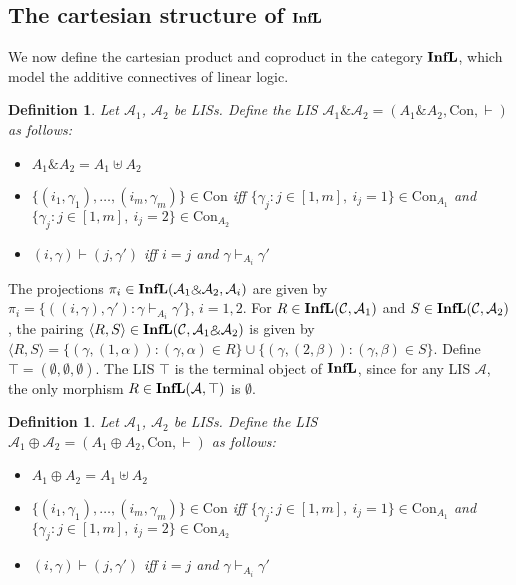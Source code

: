 \documentclass[copyright,creativecommons]{eptcs}
\newtheorem{definition}[theorem]{Definition}
\newcommand{\cA}{\mathcal{A}}
\newcommand{\cC}{\mathcal{C}}
\newcommand{\ga}{\alpha}
\newcommand{\gb}{\beta}
\newcommand{\gc}{\gamma}
\newcommand{\Con}{\mathrm{Con}} \newcommand{\Com}{\mathrm{Com}} \newcommand{\Sup}{\mathrm{Sup}} %
\begin{document}
\subsection{The cartesian structure of $\mathbf{InfL}$}

We now define the cartesian product and coproduct in the category $\mathbf{InfL}$, which model the additive connectives of linear logic.

\medskip

\begin{definition}
Let $\cA_1$, $\cA_2$ be LISs. Define the LIS $\cA_1 \binampersand \cA_2 = (A_1 \binampersand A_2, \Con, \vdash)$ as follows:
\begin{itemize}
\item $A_1 \binampersand A_2 = A_1 \uplus A_2$
\item $\{(i_1,\gc_1), \ldots, (i_m, \gc_m)\} \in \Con$ iff $\{\gc_j : j \in [1,m],\ i_j = 1\} \in \Con_{A_1}$ and $\{\gc_j : j \in [1,m],\ i_j = 2\} \in \Con_{A_2}$
\item $(i, \gc) \vdash (j,\gc')$ iff $i = j$ and $\gc \vdash_{A_i} \gc'$
\end{itemize}
\end{definition}

The projections $\pi_i \in \Infl(\cA_1 \binampersand \cA_2, \cA_i)$ are given by \mbox{$\pi_i = \{((i,\gc), \gc') : \gc \vdash_{A_i} \gc' \}$}, $i = 1,2$. For \mbox{$R \in \Infl(\cC, \cA_1)$} and \mbox{$S \in \Infl(\cC, \cA_2)$}, the pairing \mbox{$\langle R, S \rangle \in \Infl(\cC, \cA_1 \binampersand \cA_2)$} is given by \\ \mbox{$\langle R, S \rangle = \{(\gc, (1,\ga)) : (\gc, \ga) \in R \} \cup \{(\gc, (2,\gb)) : (\gc, \gb) \in S \}$.} Define $\top = (\emptyset, \emptyset, \emptyset)$. The LIS $\top$ is the terminal object of $\mathbf{InfL}$, since for any LIS $\cA$, the only morphism $R \in \Infl(\cA, \top)$ is $\emptyset$.

\medskip

\begin{definition}
Let $\cA_1$, $\cA_2$ be LISs. Define the LIS $\cA_1 \oplus \cA_2 = (A_1 \oplus A_2, \Con, \vdash)$ as follows:
\begin{itemize}
\item $A_1 \oplus A_2 = A_1 \uplus A_2$
\item $\{(i_1,\gc_1), \ldots, (i_m, \gc_m)\} \in \Con$ iff $\{\gc_j : j \in [1,m],\ i_j = 1\} \in \Con_{A_1}$ and $\{\gc_j : j \in [1,m],\ i_j = 2\} \in \Con_{A_2}$
\item $(i, \gc) \vdash (j,\gc')$ iff $i = j$ and $\gc \vdash_{A_i} \gc'$
\end{itemize}
\end{definition}
\end{document}
